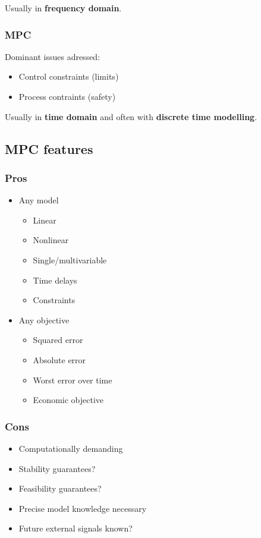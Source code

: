\documentclass[10pt,a4paper]{scrartcl}
\begin{document}
\begin{multicols*}{3}
	Usually in \textbf{frequency domain}.
	
	\subsubsection{MPC}
	Dominant issues adressed:
	\begin{itemize}
	\compaq
	\item Control constraints (limits)
	\item Process contraints (safety)
	\end{itemize}
	
	Usually in \textbf{time domain} and often with \textbf{discrete time modelling}.
	
	
	\subsection*{MPC features}
	
	\setlength{\columnseprule}{0pt}
	\subsubsection{Pros}
	\begin{multicols*}{2}
	\small
	\begin{itemize}
	\compaq
	\item Any model
	\begin{itemize}
	\compaq
	\item Linear
	\item Nonlinear
	\item Single/multivariable
	\item Time delays
	\item Constraints
	\end{itemize}
	\item Any objective
	\begin{itemize}
	\compaq
	\item Squared error
	\item Absolute error
	\item Worst error over time
	\item Economic objective
	\end{itemize}
	\end{itemize}
	\end{multicols*}
	\setlength{\columnseprule}{0.5pt}
	\subsubsection{Cons}
	\begin{itemize}
	\compaq
	\item Computationally demanding
	\item Stability guarantees?
	\item Feasibility guarantees?
	\item Precise model knowledge necessary
	\item Future external signals known?
	\end{itemize}
	\normalsize
	

\end{multicols*}
\end{document}
